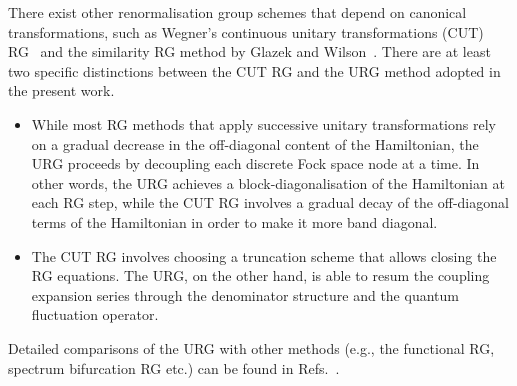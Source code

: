 \documentclass{iopart}
\begin{document}
There exist other renormalisation group schemes that depend on canonical transformations, such as Wegner's continuous unitary transformations (CUT) RG~\cite{wegner1994flow} and the similarity RG method by Glazek and Wilson~\cite{glazek1993renormalization}. There are at least two specific distinctions between the CUT RG and the URG method adopted in the present work.
\begin{itemize}
	\item While most RG methods that apply successive unitary transformations rely on a gradual decrease in the off-diagonal content of the Hamiltonian, the URG proceeds by decoupling each discrete Fock space node at a time. In other words, the URG achieves a block-diagonalisation of the Hamiltonian at each RG step, while the CUT RG involves a gradual decay of the off-diagonal terms of the Hamiltonian in order to make it more band diagonal.
	\item The CUT RG involves choosing a truncation scheme that allows closing the RG equations. The URG, on the other hand, is able to resum the coupling expansion series through the denominator structure and the quantum fluctuation operator.  
\end{itemize}
Detailed comparisons of the URG with other methods (e.g., the functional RG, spectrum bifurcation RG etc.) can be found in Refs.~\cite{anirbanmott1,anirbanurg1}.
\end{document}
